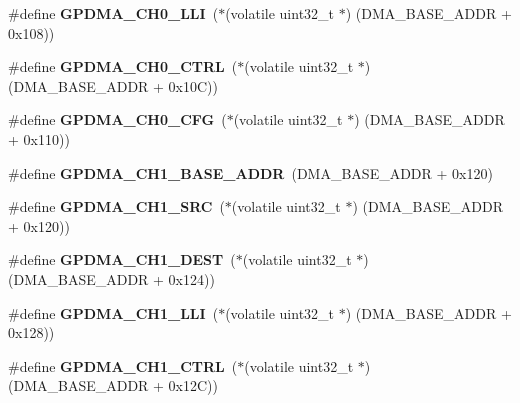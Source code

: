 \begin{DoxyCompactItemize}
\item 
\mbox{\label{group__lpc24xx__regs_ga6cd2f82d6d0906827fc593931d6a860c}} 
\#define {\bfseries G\+P\+D\+M\+A\+\_\+\+C\+H0\+\_\+\+L\+LI}~($\ast$(volatile uint32\+\_\+t $\ast$) (D\+M\+A\+\_\+\+B\+A\+S\+E\+\_\+\+A\+D\+DR + 0x108))
\item 
\mbox{\label{group__lpc24xx__regs_gad3f65318f78197a210d40f1e8098b015}} 
\#define {\bfseries G\+P\+D\+M\+A\+\_\+\+C\+H0\+\_\+\+C\+T\+RL}~($\ast$(volatile uint32\+\_\+t $\ast$) (D\+M\+A\+\_\+\+B\+A\+S\+E\+\_\+\+A\+D\+DR + 0x10\+C))
\item 
\mbox{\label{group__lpc24xx__regs_ga4c195ee7ad377ee478b4dcae144215df}} 
\#define {\bfseries G\+P\+D\+M\+A\+\_\+\+C\+H0\+\_\+\+C\+FG}~($\ast$(volatile uint32\+\_\+t $\ast$) (D\+M\+A\+\_\+\+B\+A\+S\+E\+\_\+\+A\+D\+DR + 0x110))
\item 
\mbox{\label{group__lpc24xx__regs_gab9264fef4ef0a3885b2e2bcd27fb05cc}} 
\#define {\bfseries G\+P\+D\+M\+A\+\_\+\+C\+H1\+\_\+\+B\+A\+S\+E\+\_\+\+A\+D\+DR}~(D\+M\+A\+\_\+\+B\+A\+S\+E\+\_\+\+A\+D\+DR + 0x120)
\item 
\mbox{\label{group__lpc24xx__regs_ga55a241f44798b4d7689cb8eda7cfed2b}} 
\#define {\bfseries G\+P\+D\+M\+A\+\_\+\+C\+H1\+\_\+\+S\+RC}~($\ast$(volatile uint32\+\_\+t $\ast$) (D\+M\+A\+\_\+\+B\+A\+S\+E\+\_\+\+A\+D\+DR + 0x120))
\item 
\mbox{\label{group__lpc24xx__regs_gaa5452d1d30d9ad6dfb0de13610542241}} 
\#define {\bfseries G\+P\+D\+M\+A\+\_\+\+C\+H1\+\_\+\+D\+E\+ST}~($\ast$(volatile uint32\+\_\+t $\ast$) (D\+M\+A\+\_\+\+B\+A\+S\+E\+\_\+\+A\+D\+DR + 0x124))
\item 
\mbox{\label{group__lpc24xx__regs_ga62874f970b9a5ac381d2eff755ecdcca}} 
\#define {\bfseries G\+P\+D\+M\+A\+\_\+\+C\+H1\+\_\+\+L\+LI}~($\ast$(volatile uint32\+\_\+t $\ast$) (D\+M\+A\+\_\+\+B\+A\+S\+E\+\_\+\+A\+D\+DR + 0x128))
\item 
\mbox{\label{group__lpc24xx__regs_gabd2d297640c59a8c16816c34d9efac3b}} 
\#define {\bfseries G\+P\+D\+M\+A\+\_\+\+C\+H1\+\_\+\+C\+T\+RL}~($\ast$(volatile uint32\+\_\+t $\ast$) (D\+M\+A\+\_\+\+B\+A\+S\+E\+\_\+\+A\+D\+DR + 0x12\+C))

\end{DoxyCompactItemize}
